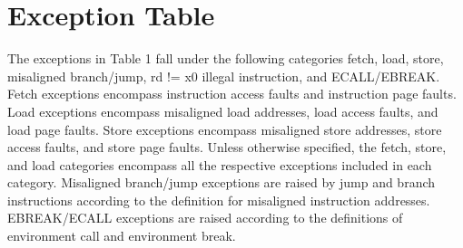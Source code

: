 \documentclass[12pt]{article}
\begin{document}
\section{Exception Table}
The exceptions in Table 1 fall under the following categories fetch, load, store, misaligned branch/jump, rd != x0 illegal instruction, and ECALL/EBREAK. Fetch exceptions encompass instruction access faults and instruction page faults. Load exceptions encompass misaligned load addresses, load access faults, and load page faults. Store exceptions encompass misaligned store addresses, store access faults, and store page faults. Unless otherwise specified, the fetch, store, and load categories encompass all the respective exceptions included in each category. Misaligned branch/jump exceptions are raised by jump and branch instructions according to the definition for misaligned instruction addresses. EBREAK/ECALL exceptions are raised according to the definitions of environment call and environment break.
\end{document}
